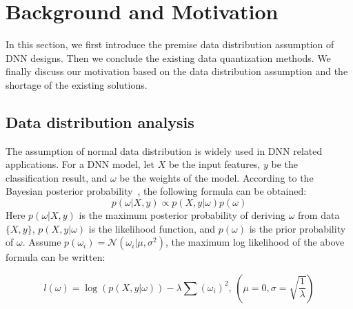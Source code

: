 \section{Background and Motivation}\label{sec:backandmo}
In this section, we first introduce the premise data distribution assumption of DNN designs. Then we conclude the existing data quantization methods. We finally discuss our motivation based on the data distribution assumption and the shortage of the existing solutions.

\subsection{Data distribution analysis}
The assumption of normal data distribution is widely used in DNN related applications.
For a DNN model, let $X$ be the input features, $y$ be the classification result, and $\omega$ be the weights of the model.
According to the Bayesian posterior probability~\citep{nasrabadi2007pattern,robert2014machine}, the following formula can be obtained:
    \begin{equation}
       p(\omega|X,y) \propto p(X,y|\omega)p(\omega)
    \end{equation}
Here $p(\omega|X,y)$ is the maximum posterior probability of deriving $\omega$ from data $\{X,y\}$, $p(X,y|\omega)$ is the likelihood function, and $p(\omega)$ is the prior probability of $\omega$.
Assume $p(\omega_i) = \mathcal{N}(\omega_i|\mu,\sigma^2)$,
the maximum log likelihood of the above formula can be written:

\vspace{-2mm}
\begin{equation}
        l(\omega)=\log(p(X,y|\omega))-\lambda\sum(\omega_i)^2,\,(\mu=0,\sigma=\sqrt{\frac{1}{\lambda}})
    \end{equation}

